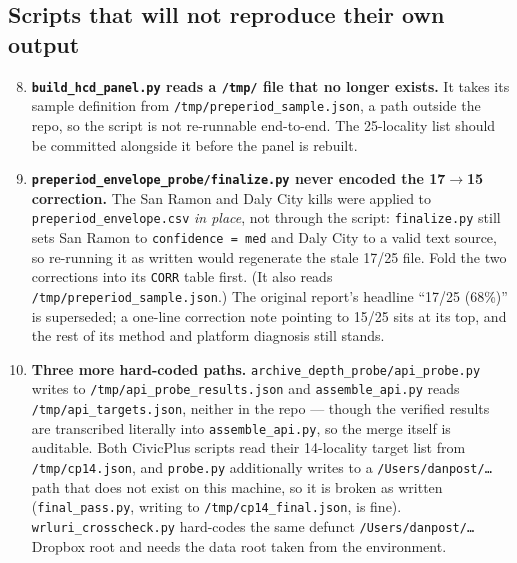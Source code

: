 \documentclass[11pt]{article}
\begin{document}
\subsection{Scripts that will not reproduce their own output}

\begin{enumerate}
\setcounter{enumi}{7}

\item \textbf{\texttt{build\_hcd\_panel.py} reads a \texttt{/tmp/} file that no longer exists.} It
takes its sample definition from \texttt{/tmp/preperiod\_sample.json}, a path outside the repo, so
the script is not re-runnable end-to-end. The 25-locality list should be committed alongside it
before the panel is rebuilt.

\item \textbf{\texttt{preperiod\_envelope\_probe/finalize.py} never encoded the
17$\rightarrow$15 correction.} The San Ramon and Daly City kills were applied to
\texttt{preperiod\_envelope.csv} \emph{in place}, not through the script: \texttt{finalize.py}
still sets San Ramon to \texttt{confidence = med} and Daly City to a valid text source, so
re-running it as written would regenerate the stale 17/25 file. Fold the two corrections into its
\texttt{CORR} table first. (It also reads \texttt{/tmp/preperiod\_sample.json}.) The original
report's headline ``17/25 (68\%)'' is superseded; a one-line correction note pointing to 15/25
sits at its top, and the rest of its method and platform diagnosis still stands.

\item \textbf{Three more hard-coded paths.} \texttt{archive\_depth\_probe/api\_probe.py} writes to
\texttt{/tmp/api\_probe\_results.json} and \texttt{assemble\_api.py} reads
\texttt{/tmp/api\_targets.json}, neither in the repo --- though the verified results are
transcribed literally into \texttt{assemble\_api.py}, so the merge itself is auditable. Both
CivicPlus scripts read their 14-locality target list from \texttt{/tmp/cp14.json}, and
\texttt{probe.py} additionally writes to a \texttt{/Users/danpost/\dots} path that does not exist
on this machine, so it is broken as written (\texttt{final\_pass.py}, writing to
\texttt{/tmp/cp14\_final.json}, is fine). \texttt{wrluri\_crosscheck.py} hard-codes the same
defunct \texttt{/Users/danpost/\dots} Dropbox root and needs the data root taken from the
environment.


\end{enumerate}
\end{document}
